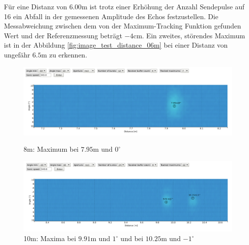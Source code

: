 Für eine Distanz von $6.00 \mathrm{m}$ ist trotz einer Erhöhung der Anzahl Sendepulse auf 16 ein Abfall in der gemessenen Amplitude des Echos festzustellen. Die Messabweichung zwischen dem von der Maximum-Tracking Funktion gefunden Wert und der Referenzmessung beträgt $-4 \mathrm{cm}$. Ein zweites, störendes Maximum ist in der Abbildung \ref{fig:image_test_distance_06m} bei einer Distanz von ungefähr $6.5 \mathrm{m}$ zu erkennen.
\clearpage
\begin{figure}[htb]
\begin{minipage}{1.0\textwidth}
\includegraphics[width=\textwidth]{graphics/image_test_distance_08m.png}
\caption{8m: Maximum bei $7.95 \mathrm{m}$ und $0^{\circ}$} %
\label{fig:image_test_distance_08m}
%
\end{minipage}
\begin{minipage}{1.0\textwidth}
\includegraphics[width=\textwidth]{graphics/image_test_distance_10m.png}
\caption{10m: Maxima bei $9.91 \mathrm{m}$ und $1^{\circ}$ und bei $10.25 \mathrm{m}$ und $-1^{\circ}$} %
\label{fig:image_test_distance_10m}
%
\end{minipage}
\end{figure}

